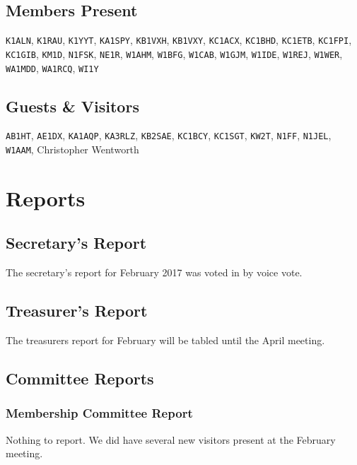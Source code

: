 \documentclass[10pt,letterpaper]{article}
\begin{document}
\subsection{Members Present}
\texttt{K1ALN},
\texttt{K1RAU},
\texttt{K1YYT},
\texttt{KA1SPY},
\texttt{KB1VXH},
\texttt{KB1VXY},
\texttt{KC1ACX},
\texttt{KC1BHD},
\texttt{KC1ETB},
\texttt{KC1FPI},
\texttt{KC1GIB},
\texttt{KM1D},
\texttt{N1FSK},
\texttt{NE1R},
\texttt{W1AHM},
\texttt{W1BFG},
\texttt{W1CAB},
\texttt{W1GJM},
\texttt{W1IDE},
\texttt{W1REJ},
\texttt{W1WER},
\texttt{WA1MDD},
\texttt{WA1RCQ},
\texttt{WI1Y}

\subsection{Guests \& Visitors}
\texttt{AB1HT},
\texttt{AE1DX},
\texttt{KA1AQP},
\texttt{KA3RLZ},
\texttt{KB2SAE},
\texttt{KC1BCY},
\texttt{KC1SGT},
\texttt{KW2T},
\texttt{N1FF},
\texttt{N1JEL},
\texttt{W1AAM},
Christopher Wentworth


\section{Reports}

\subsection{Secretary's Report}
The secretary's report for February 2017 was voted in by voice vote.

\newpage
\subsection{Treasurer's Report}
The treasurers report for February will be tabled until the April meeting.

\subsection{Committee Reports}

\subsubsection{Membership Committee Report}
Nothing to report. We did have several new visitors present at the February meeting.
\end{document}
